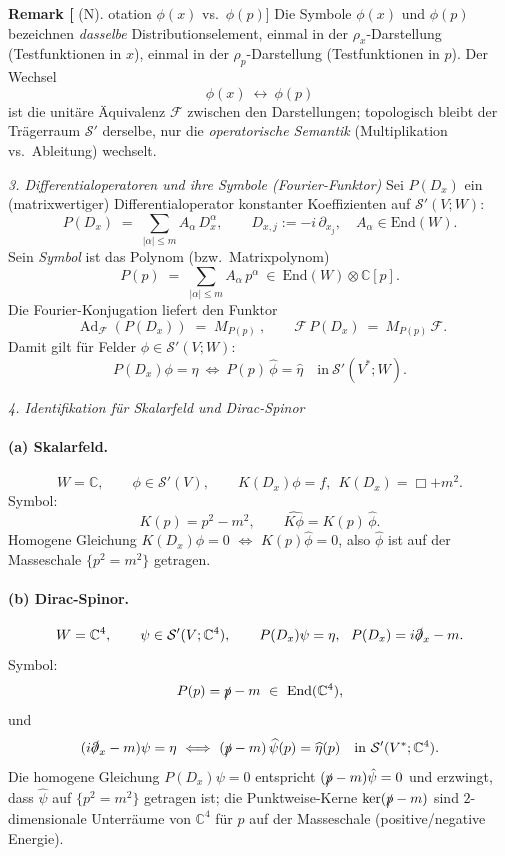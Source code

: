\documentclass[10pt, letterpaper]{article}
\newcommand{\Ad}{\operatorname{Ad}}
\newcommand{\C}{\mathbb{C}}
\newcommand{\End}{\mathrm{End}}
\newcommand{\CustomHeading}[3]{%
  \par\medskip\noindent%
  \textbf{#1 #2} \textnormal{(#3)}.\enskip%
}
\newenvironment{REM}[2]{\begin{unitbox}\CustomHeading{Remark}{#1}{#2}}{\end{unitbox}}
\begin{document}
\begin{REM}[Notation $\phi(x)$ vs.\ $\phi(p)$]
Die Symbole $\phi(x)$ und $\phi(p)$ bezeichnen \emph{dasselbe} Distributionselement,
einmal in der $\rho_x$-Darstellung (Testfunktionen in $x$), einmal in der $\rho_p$-Darstellung
(Testfunktionen in $p$). Der Wechsel
\[
\phi(x)\ \longleftrightarrow\ \phi(p)
\]
ist die unitäre Äquivalenz $\mathcal{F}$ zwischen den Darstellungen; topologisch bleibt der Trägerraum
$\mathcal{S}'$ derselbe, nur die \emph{operatorische Semantik} (Multiplikation vs.\ Ableitung) wechselt.
\end{REM}

\emph{3. Differentialoperatoren und ihre Symbole (Fourier-Funktor)}
Sei $P(D_x)$ ein (matrixwertiger) Differentialoperator konstanter Koeffizienten auf $\mathcal{S}'(V;W)$:
\[
P(D_x)\;=\;\sum_{|\alpha|\le m} A_\alpha\,D_x^\alpha,\qquad D_{x,j}:=-i\,\partial_{x_j},\quad A_\alpha\in\End(W).
\]
Sein \emph{Symbol} ist das Polynom (bzw.\ Matrixpolynom)
\[
P(p)\;=\;\sum_{|\alpha|\le m} A_\alpha\,p^\alpha\ \in\ \End(W)\otimes\C[p].
\]
Die Fourier-Konjugation liefert den Funktor
\[
\boxed{\ \Ad_{\mathcal{F}}(P(D_x))\;=\;M_{P(p)}\ },
\qquad
\mathcal{F}\,P(D_x)\ =\ M_{P(p)}\,\mathcal{F}.
\]
Damit gilt für Felder $\phi\in\mathcal{S}'(V;W)$:
\[
P(D_x)\phi=\eta\ \Longleftrightarrow\ P(p)\,\hat\phi=\hat\eta
\quad\text{in}\ \mathcal{S}'(V^\ast;W).
\]

\emph{4. Identifikation für Skalarfeld und Dirac-Spinor}

\paragraph{(a) Skalarfeld.}
\[
W=\C,\qquad \phi\in\mathcal{S}'(V),\qquad
K(D_x)\phi= f,\ \ K(D_x)=\Box+m^2.
\]
Symbol:
\[
K(p)=p^2-m^2,\qquad \widehat{K\phi}=K(p)\,\hat\phi.
\]
Homogene Gleichung $K(D_x)\phi=0$ $\Leftrightarrow$ $K(p)\hat\phi=0$, also $\hat\phi$ ist auf der Masseschale $\{p^2=m^2\}$ getragen.

\paragraph{(b) Dirac-Spinor.}
\[
W=\C^4,\qquad \psi\in\mathcal{S}'(V;\C^4),\qquad
P(D_x)\psi=\eta,\ \ P(D_x)=i\slashed{\partial}_x - m.
\]
Symbol:
\[
P(p)=\slashed{p}-m\ \in\ \End(\C^4),
\]
und
\[
(i\slashed{\partial}_x-m)\psi=\eta
\ \Longleftrightarrow\
(\slashed{p}-m)\,\widehat{\psi}(p)=\widehat{\eta}(p)
\quad\text{in}\ \mathcal{S}'(V^\ast;\C^4).
\]
Die homogene Gleichung $P(D_x)\psi=0$ entspricht $(\slashed{p}-m)\hat\psi=0$ und erzwingt, dass
$\hat\psi$ auf $\{p^2=m^2\}$ getragen ist; die Punktweise-Kerne $\ker(\slashed{p}-m)$ sind
$2$-dimensionale Unterräume von $\C^4$ für $p$ auf der Masseschale (positive/negative Energie).
\end{document}
